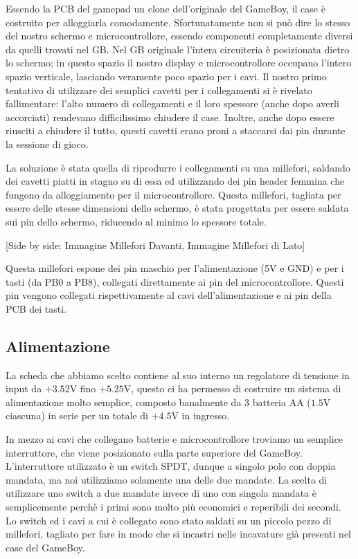 \documentclass[hidelinks,12pt]{article}
\begin{document}
Essendo la PCB del gamepad un clone dell'originale del GameBoy, il case è
costruito per alloggiarla comodamente. Sfortunatamente non si può dire lo
stesso del nostro schermo e microcontrollore, essendo componenti completamente
diversi da quelli trovati nel GB.
Nel GB originale l'intera circuiteria è posizionata dietro lo schermo; in
questo spazio il nostro display e microcontrollore occupano l'intero spazio
verticale, lasciando veramente poco spazio per i cavi.
Il nostro primo tentativo di utilizzare dei semplici cavetti per i collegamenti
si è rivelato fallimentare: l'alto numero di collegamenti e il loro spessore
(anche dopo averli accorciati) rendevano difficilissimo chiudere il case.
Inoltre, anche dopo essere riusciti a chiudere il tutto, questi cavetti erano
proni a staccarsi dai pin durante la sessione di gioco.

La soluzione è stata quella di riprodurre i collegamenti su una millefori,
saldando dei cavetti piatti in stagno su di essa ed utilizzando dei pin header
femmina che fungono da alloggiamento per il microcontrollore.
Questa millefori, tagliata per essere delle stesse dimensioni dello schermo, è
stata progettata per essere saldata sui pin dello schermo, riducendo al minimo
lo spessore totale.

[Side by side: Immagine Millefori Davanti, Immagine Millefori di Lato]

Questa millefori espone dei pin maschio per l'alimentazione (5V e GND)
e per i tasti (da PB0 a PB8), collegati direttamente ai pin del
microcontrollore.
Questi pin vengono collegati rispettivamente al cavi dell'alimentazione e
ai pin della PCB dei tasti. 

\subsection{Alimentazione}
La scheda che abbiamo scelto contiene al suo interno un regolatore di tensione
in input da $+3.52$V fino $+5.25$V, questo ci ha permesso di costruire un
sistema di alimentazione molto semplice, composto banalmente da 3 batteria AA
($1.5$V ciascuna) in serie per un totale di $+4.5$V in ingresso.

In mezzo ai cavi che collegano batterie e microcontrollore troviamo un semplice
interruttore, che viene posizionato sulla parte superiore del GameBoy.
L'interruttore utilizzato è un switch SPDT, dunque a singolo polo con doppia
mandata, ma noi utilizziamo solamente una delle due mandate.
La scelta di utilizzare uno switch a due mandate invece di uno con singola
mandata è semplicemente perchè i primi sono molto più economici e reperibili
dei secondi.
Lo switch ed i cavi a cui è collegato sono stato saldati su un piccolo pezzo
di millefori, tagliato per fare in modo che si incastri nelle incavature già
presenti nel case del GameBoy.



\nocite{*}
\printbibliography
\end{document}
